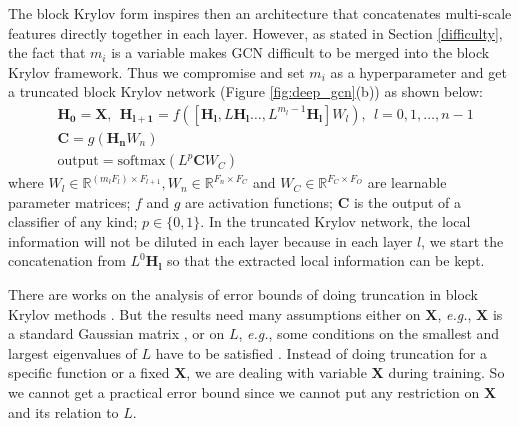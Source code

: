 \documentclass{article}
\newcommand\eg{\textit{e.g.}}
\begin{document}
The block Krylov form inspires then an architecture that concatenates multi-scale features directly together in each layer.
However, as stated in Section \ref{difficulty}, the fact that $m_i$ is a variable makes GCN difficult to be merged into the block Krylov framework. Thus we compromise and set $m_i$ as a hyperparameter and get a truncated block Krylov network (Figure \ref{fig:deep_gcn}(b)) as shown below:
\begin{align}
&\bm{H_0} = \bm{X}, \ \ \bm{H_{l+1}}=f \left( \left[ \bm{H_l}, L \bm{H_l} \dots, L^{m_l -1} \bm{H_l} \right] W_l   \right), \ \ l=0,1,\dots,n - 1 \nonumber \\
& \bm{C} = g \left( \bm{H_n} W_n   \right)\\
& \mbox{output} = \text{softmax} \left(L^{p} \bm{C} W_C \right) \nonumber
\end{align}
where $W_l \in \mathbb{R}^{\left( m_l F_l \right)  \times F_{l+1} }, W_n \in \mathbb{R}^{ F_n \times F_C}$ and $W_C \in \mathbb{R}^{F_C \times F_O}$ are learnable parameter matrices; $f$ and $g$ are activation functions; $\bm{C}$ is the output of a classifier of any kind; $p \in \{0,1\}$. In the truncated Krylov network, the local information will not be diluted in each layer because in each layer $l$, we start the concatenation from $L^0 \bm{H_l}$ so that the extracted local information can be kept.

There are works on the analysis of error bounds of doing truncation in block Krylov methods \cite{frommer2017block}. But the results need many assumptions either on $\bm{X}$, \eg{}, $\bm{X}$ is a standard Gaussian matrix \cite{ wang2015improved}, or on $L$, \eg{}, some conditions on the smallest and largest eigenvalues of $L$ have to be satisfied \cite{musco2018stability}. Instead of doing truncation for a specific function or a fixed $\bm{X}$, we are dealing with variable $\bm{X}$ during training. So we cannot get a practical error bound since we cannot put any restriction on $\bm{X}$ and its relation to $L$.
\end{document}

